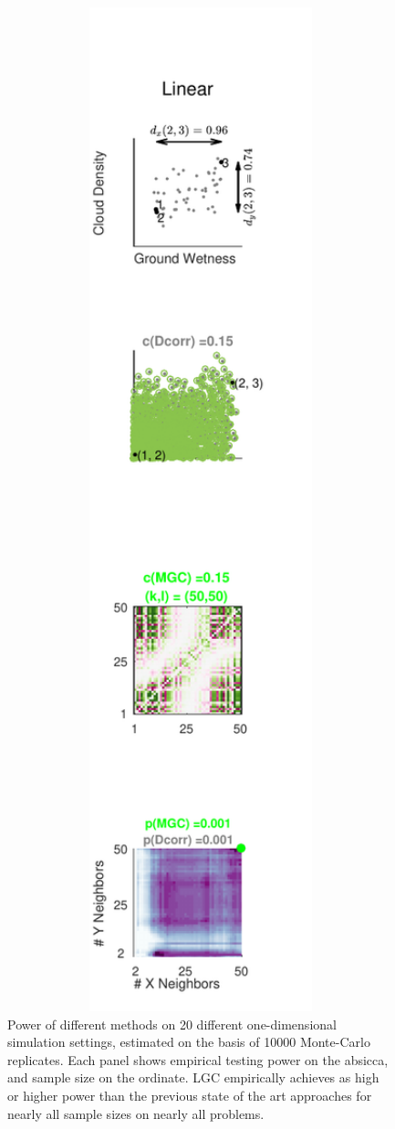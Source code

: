 \documentclass[11pt]{article}
\begin{document}
\begin{figure}[htbp]
\includegraphics[width=1.0\textwidth]{../Figures/Fig1}
\caption{
Power of different methods on 20 different one-dimensional simulation settings, estimated on the basis of 10000 Monte-Carlo replicates.
Each panel shows empirical testing power on the absicca, and sample size on the ordinate.
LGC empirically achieves as high or higher power than the previous state of the art approaches for nearly all sample sizes on nearly all problems.}
\label{fig:1D}
\end{figure}
\end{document}
